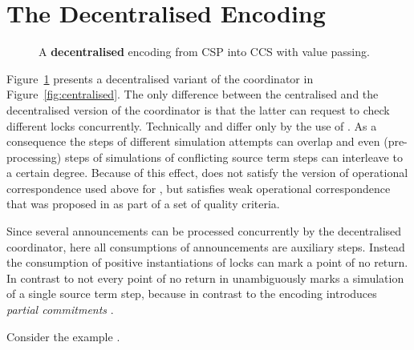 \documentclass[copyright,creativecommons]{eptcs}
\begin{document}
\section{The Decentralised Encoding}
\label{sec:decentral}

\begin{figure}
	
	\caption{A \textbf{decentralised} encoding from CSP into CCS with value passing.}
	\label{fig:decentralised}
\end{figure}

Figure~\ref{fig:decentralised} presents a decentralised variant of the coordinator in Figure~\ref{fig:centralised}.
The only difference between the centralised and the decentralised version of the coordinator is that the latter can request to check different locks concurrently. Technically  and  differ only by the use of . As a consequence the steps of different simulation attempts can overlap and even (pre-processing) steps of simulations of conflicting source term steps can interleave to a certain degree. Because of this effect,  does not satisfy the version of operational correspondence used above for , but  satisfies weak operational correspondence that was proposed in \cite{gorla10} as part of a set of quality criteria.

Since several announcements can be processed concurrently by the decentralised coordinator, here all consumptions of announcements are auxiliary steps. Instead the consumption of positive instantiations of locks can mark a point of no return. In contrast to  not every point of no return in  unambiguously marks a simulation of a single source term step, because in contrast to  the encoding  introduces \emph{partial commitments} \cite{peters12,petersNestmann12}.

Consider the example .
\end{document}

